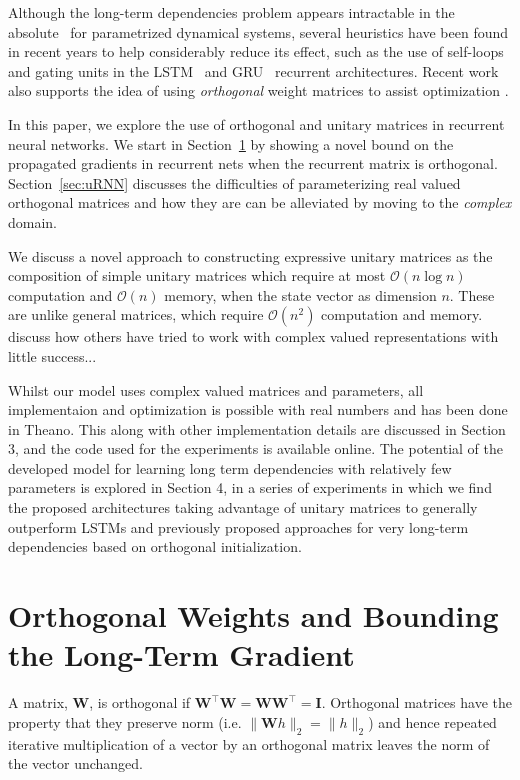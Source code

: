 \documentclass{article} %
\newcommand{\matr}[1]{\mathbf{#1}}
\begin{document}
Although the long-term dependencies problem appears intractable in the absolute~\citep{Yoshua94} for
parametrized dynamical systems, several heuristics have been found in recent years to help considerably
reduce its effect, such as the use of self-loops and gating units in the LSTM~\citep{LSTM}
and GRU~\citep{Cho2014a} recurrent architectures.
Recent work also supports the idea of using \textit{orthogonal} weight matrices to assist optimization  
\citep{Saxe2014} \citep{Quoc2015}.


In this paper, we explore the use of orthogonal and unitary matrices in recurrent neural networks.
We start in Section~\ref{sec:ortho} by showing a novel bound on the propagated gradients
in recurrent nets when the recurrent matrix is orthogonal.
Section~\ref{sec:uRNN} discusses the difficulties of parameterizing real valued orthogonal matrices and how
they are can be alleviated by moving to the \textit{complex} domain. 

We discuss a novel approach to constructing expressive unitary matrices as the composition of simple
unitary matrices which require at most $\mathcal{O}(n \log n)$ computation and $\mathcal{O}(n)$ memory,
when the state vector as dimension $n$. These are
unlike general matrices, which require $\mathcal{O}(n^2)$ computation and memory. {\color{red} discuss how 
others have tried to work with complex valued representations with little success... }

Whilst our model uses complex valued matrices and parameters, all
implementaion and optimization is possible with real numbers and has been
done in Theano. This along with other implementation details are discussed
in Section 3, and the code used for the experiments is available online.
The potential of the developed model for learning long term dependencies
with relatively few parameters is explored in Section 4, in a series of
experiments in which we find the proposed architectures taking advantage of
unitary matrices to generally outperform LSTMs and previously proposed
approaches for very long-term dependencies based on orthogonal
initialization.

\section{Orthogonal Weights and Bounding the Long-Term Gradient}
\label{sec:ortho}

A matrix, $\matr{W}$, is orthogonal if 
$\matr{W}^\top \matr{W} = \matr{W} \matr{W}^\top = \matr{I}$. 
Orthogonal matrices have the property that they preserve norm (i.e. $\| \matr{W} h \|_2 = \| h \|_2$)
and hence repeated iterative multiplication of a vector by an orthogonal matrix leaves the norm of the 
vector unchanged.
\end{document}
